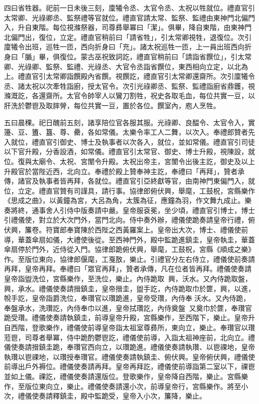 \begin{pinyinscope}
 四曰省牲器。祀前一日未後三刻，廩犧令丞、太官令丞、太祝以牲就位。禮直官引太常卿、光祿卿丞、監祭禮等官就位。禮直官請太常、監祭、監禮由東神門北偏門入，升自東階。每位視滌祭器，司尊彞舉冪曰「潔」。俱畢，降自東階，由東神門北偏門出，復位，立定。禮直官稍前曰「請省牲」，引太常卿視牲，退復位。次引廩犧令出班，巡牲一匝，西向折身曰「充」。諸太祝巡牲一匝，上一員出班西向折身曰「腯」畢，俱復位。蒙古巫祝致詞訖，禮直官稍前曰「請詣省饌位」，引太常卿、光祿卿、監祭、監禮、光祿丞、大官令丞詣省饌位，東西相向立定，以北為上。禮直官引太常卿詣饌殿內省饌。視饌訖，禮直官引太常卿還齋所。次引廩犧令丞、諸太祝以次牽牲詣廚，授太官令。次引光祿卿丞、監祭、監禮詣廚省鼎鑊，視滌溉訖，各還齋所。太官令帥宰人以鸞刀割牲，祝史各取毛血，每位共實一豆，以肝洗於鬱鬯及取膟膋，每位共實一豆，置於各位。饌室內，庖人烹牲。



 五曰晨稞。祀日醜前五刻，諸享陪位官各服其服。光祿卿、良醖令、太官令入，實籩、豆、簠、簋、尊、罍，各如常儀。太樂令率工人二舞，以次入。奉禮郎贊者先入就位，禮直官引御史、博士及執事者以次各入，就位，並如常儀。禮直官引司徒以下官升殿，分香設酒，如常儀。禮直官引太常官、御史、博士升殿，視陳設，就位。復與太廟令、太祝、宮闈令升殿。太祝出帝主，宮闈令出後主訖，御史及以上升殿官於當陛近西，北向立。奉禮於殿上贊奉神主訖，奉禮曰「再拜」，贊者承傳，諸官及執事者皆再拜，各就位。禮直官引亞終獻等官，由南神門東偏門入，就位，立定。禮直官贊有司謹具，請行事。協律郎俯伏興，舉麾，工鼓柷，宮縣樂作《思成之曲》，以黃鐘為宮，大呂為角，太簇為征，應鐘為羽，作文舞九成止。樂奏將終，通事舍人引侍中版奏請中嚴。皇帝服袞冕，坐少頃，禮直官引博士，博士引禮儀使，對立於大次門外，當門北向。侍中奏外辦，禮儀使跪奏請皇帝行禮，俯伏興，簾卷。符寶郎奉寶陳於西陛之西黃羅案上。皇帝出大次，博士、禮儀使前導，華蓋傘扇如儀，大禮使後從。至西神門外，殿中監跪進鎮圭，皇帝執圭，華蓋傘扇停於門外，近侍從入門。協律郎跪俯伏興，舉麾，工鼓柷，宮縣《順成之樂》作。至版位東向，協律郎偃麾，工戛敔，樂止。引禮官分左右侍立，禮儀使前奏請再拜，皇帝再拜。奉禮曰「眾官再拜」，贊者承傳，凡在位者皆再拜。禮儀使奏請皇帝詣盥洗位，宮縣樂作，至洗位，樂止。內侍跪取，興，沃水。又內侍跪取盤，興，承水。禮儀使奏請搢鎮圭，皇帝搢圭，盥手訖，內侍跪取巾於篚，興，以進，帨手訖，皇帝詣爵洗位，奉瓚官以瓚跪進，皇帝受瓚，內侍奉沃水。又內侍跪，奉盤承水，洗瓚訖，內侍奉巾以進，皇帝拭瓚訖，內侍奠盤，又奠巾於篚，奉瓚官跪受瓚。禮儀使奏請執鎮圭，前導皇帝升殿，宮縣樂作，至西階下，樂止。皇帝升自西階，登歌樂作，禮儀使前導皇帝詣太祖室尊彞所，東向立，樂止。奉瓚官以瓚蒞鬯，司尊者舉冪，侍中跪酌鬱鬯訖，禮儀使前導，入詣太祖神座前，北向立。禮儀使奏請搢鎮圭跪，奉瓚官西向立，以瓚跪進。禮儀使奏請執瓚、以鬯祼地，皇帝執瓚以鬯祼地，以瓚授奉瓚官。禮儀使奏請執鎮圭、俯伏興。皇帝俯伏興，禮儀使前導出戶外褥位。禮儀使奏請再拜。皇帝再拜訖，禮儀使前導詣第二室以下，祼鬯並如上儀。祼訖，禮儀使奏請還版位。登歌樂作，皇帝降自西階，樂止。宮縣樂作，至版位東向立，樂止。禮儀使奏請還小次，前導皇帝行，宮縣樂作。將至小次，禮儀使奏請釋鎮圭，殿中監跪受，皇帝入小次，簾降，樂止。




\end{pinyinscope}
